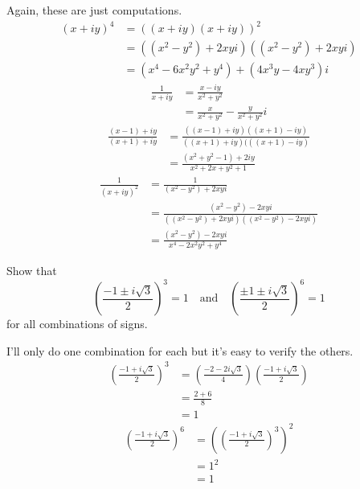 \documentclass[../../master.tex]{subfiles}
\begin{document}
\begin{solution}
    Again, these are just computations.
    \begin{align*}
        (x+iy)^4 &= \left((x+iy)(x+iy)\right)^2 \\
                &= \left((x^2 - y^2) + 2xyi\right)\left((x^2-y^2) + 2xyi\right) \\
                &= (x^4 - 6x^2y^2 + y^4) + (4x^3y - 4xy^3)i
    \end{align*}
    \begin{align*}
        \frac{1}{x+iy} &= \frac{x - iy}{x^2 + y^2} \\
                       &= \frac{x}{x^2 + y^2} - \frac{y}{x^2 + y^2}i
    \end{align*}
    \begin{align*}
        \frac{(x-1) + iy}{(x+1) + iy} &= \frac{\left((x-1) + iy\right)\left((x+1) - iy\right)}{\left((x+1) + iy\right)(\left((x+1) - iy\right)} \\
                                      &= \frac{(x^2 + y^2 - 1) + 2iy}{x^2 + 2x + y^2 +1}
    \end{align*}
    \begin{align*}
        \frac{1}{(x+iy)^2} &= \frac{1}{(x^2 - y^2) + 2xyi} \\
                           &= \frac{(x^2 - y^2) - 2xyi}{((x^2 - y^2) + 2xyi)((x^2 - y^2) - 2xyi)} \\
                           &= \frac{(x^2 - y^2) - 2xyi}{x^4 - 2x^2y^2 + y^4}
    \end{align*}
\end{solution}
\begin{problem}
    Show that
    \[
        \left(\frac{-1 \pm i \sqrt{3}}{2}\right)^3 = 1 \quad \text{and} \quad \left(\frac{\pm 1 \pm i \sqrt{3}}{2}\right)^{6} = 1
    \]
    for all combinations of signs.
\end{problem}

\begin{solution}
    I'll only do one combination for each but it's easy to verify the others.
    \begin{align*}
        \left(\frac{-1 + i \sqrt{3}}{2}\right)^{3} &= \left(\frac{-2 - 2i\sqrt{3}}{4}\right) \left(\frac{-1 + i \sqrt{3}}{2}\right) \\
                                 &= \frac{2 + 6}{8} \\
                                 &= 1
    \end{align*}
    \begin{align*}
        \left(\frac{-1 + i\sqrt{3}}{2}\right)^{6} &= \left(\left(\frac{-1 +i\sqrt{3}}{2}\right)^{3}\right)^{2} \\
                                &= 1^2 \\
                                &= 1
    \end{align*}
\end{solution}
\end{document}
